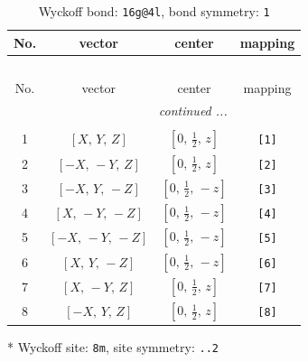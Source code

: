 \documentclass[fleqn,8pt]{jsarticle}
\begin{document}
\begin{longtable}{cccc}
\caption{Wyckoff bond: {\tt 16g@4l}, bond symmetry: {\tt 1}}
 \\
 \hline \hline
No. & vector & center & mapping \\ \hline \endfirsthead

\multicolumn{3}{l}{\tablename\ \thetable{}} \\
 \hline \hline
No. & vector & center & mapping \\ \hline \endhead

 \hline \hline
\multicolumn{3}{r}{\footnotesize\it continued ...} \\ \endfoot

 \hline \hline
\multicolumn{3}{r}{} \\ \endlastfoot

1 & $\left[ X,\, Y,\, Z \right]$ & $\left[ 0,\, \frac{1}{2},\, z \right]$ & {\tt [1]} \\ \hline
2 & $\left[ - X,\, - Y,\, Z \right]$ & $\left[ 0,\, \frac{1}{2},\, z \right]$ & {\tt [2]} \\ \hline
3 & $\left[ - X,\, Y,\, - Z \right]$ & $\left[ 0,\, \frac{1}{2},\, - z \right]$ & {\tt [3]} \\ \hline
4 & $\left[ X,\, - Y,\, - Z \right]$ & $\left[ 0,\, \frac{1}{2},\, - z \right]$ & {\tt [4]} \\ \hline
5 & $\left[ - X,\, - Y,\, - Z \right]$ & $\left[ 0,\, \frac{1}{2},\, - z \right]$ & {\tt [5]} \\ \hline
6 & $\left[ X,\, Y,\, - Z \right]$ & $\left[ 0,\, \frac{1}{2},\, - z \right]$ & {\tt [6]} \\ \hline
7 & $\left[ X,\, - Y,\, Z \right]$ & $\left[ 0,\, \frac{1}{2},\, z \right]$ & {\tt [7]} \\ \hline
8 & $\left[ - X,\, Y,\, Z \right]$ & $\left[ 0,\, \frac{1}{2},\, z \right]$ & {\tt [8]} \\
\end{longtable}
* Wyckoff site: {\tt 8m}, site symmetry: {\tt ..2}
\renewcommand{\arraystretch}{1.2}
\end{document}
